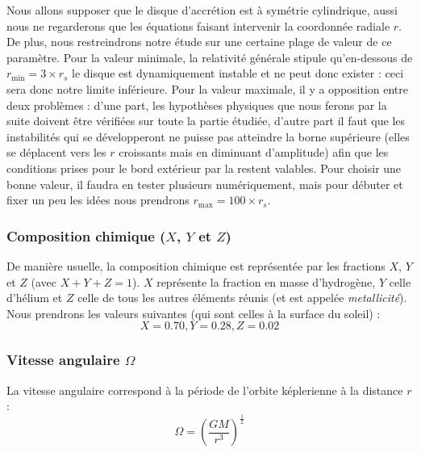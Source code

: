 Nous allons supposer que le disque d’accrétion est à symétrie cylindrique,
aussi nous ne regarderons que les équations faisant intervenir la coordonnée
radiale $r$. De plus, nous restreindrons notre étude sur une certaine plage de
valeur de ce paramètre. Pour la valeur minimale, la relativité générale stipule
qu’en-dessous de $r_\mathrm{min} = 3 \times r_s$ le disque est dynamiquement
instable et ne peut donc exister : ceci sera donc notre limite inférieure. Pour
la valeur maximale, il y a opposition entre deux problèmes : d’une part, les
hypothèses physiques que nous ferons par la suite doivent être vérifiées sur
toute la partie étudiée, d’autre part il faut que les instabilités qui se
développeront ne puisse pas atteindre la borne supérieure (elles se déplacent
vers les $r$ croissants mais en diminuant d’amplitude) afin que les conditions
prises pour le bord extérieur par la restent valables. Pour choisir une bonne
valeur, il faudra en tester plusieurs numériquement, mais pour débuter et fixer
un peu les idées nous prendrons $r_\mathrm{max} = 100 \times r_s$.

\subsubsection{\texorpdfstring{Composition chimique ($X$, $Y$ et $Z$)}{Composition chimique (X, Y et Z)}}

De manière usuelle, la composition chimique est représentée par les fractions
$X$, $Y$ et $Z$ (avec $X + Y + Z = 1$). $X$ représente la fraction en masse
d’hydrogène, $Y$ celle d’hélium et $Z$ celle de tous les autres éléments réunis
(et est appelée \textit{metallicité}). Nous prendrons les valeurs suivantes
(qui sont celles à la surface du soleil) :
\begin{equation}
    \label{eq:compo_chimique}
    X = 0.70, Y = 0.28, Z = 0.02
\end{equation}

\subsubsection{\texorpdfstring{Vitesse angulaire $\Omega$}{Vitesse angulaire Ω}}

La vitesse angulaire correspond à la période de l’orbite képlerienne à la
distance $r$ :
\begin{equation}
    \label{eq:vitesse_angulaire}
    \Omega = \left( \frac{G M}{r^3} \right)^\frac{1}{2}
\end{equation}

